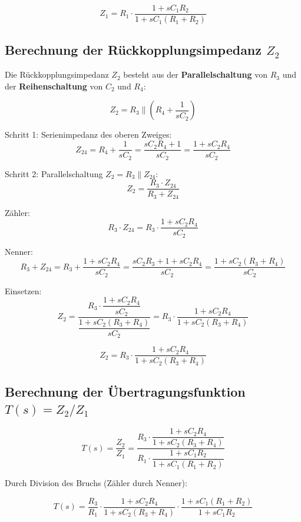 \documentclass[12pt,a4paper]{article}
\begin{document}
\begin{tcolorbox}[ergebnis]
\[
  \boxed{Z_1 = R_1 \cdot \frac{1 + sC_1 R_2}{1 + sC_1(R_1 + R_2)}}
\]
\end{tcolorbox}

\subsection{Berechnung der Rückkopplungsimpedanz $Z_2$}

Die Rückkopplungsimpedanz $Z_2$ besteht aus der \textbf{Parallelschaltung} von $R_3$
und der \textbf{Reihenschaltung} von $C_2$ und $R_4$:

\[
  Z_2 = R_3 \parallel \left(R_4 + \frac{1}{sC_2}\right)
\]

Schritt 1: Serienimpedanz des oberen Zweiges:
\[
  Z_{24} = R_4 + \frac{1}{sC_2} = \frac{sC_2 R_4 + 1}{sC_2}
          = \frac{1 + sC_2 R_4}{sC_2}
\]

Schritt 2: Parallelschaltung $Z_2 = R_3 \parallel Z_{24}$:
\[
  Z_2 = \frac{R_3 \cdot Z_{24}}{R_3 + Z_{24}}
\]

Zähler:
\[
  R_3 \cdot Z_{24} = R_3 \cdot \frac{1 + sC_2 R_4}{sC_2}
\]

Nenner:
\[
  R_3 + Z_{24} = R_3 + \frac{1 + sC_2 R_4}{sC_2}
               = \frac{sC_2 R_3 + 1 + sC_2 R_4}{sC_2}
               = \frac{1 + sC_2(R_3 + R_4)}{sC_2}
\]

Einsetzen:
\[
  Z_2 = \frac{R_3 \cdot \dfrac{1 + sC_2 R_4}{sC_2}}{\dfrac{1 + sC_2(R_3 + R_4)}{sC_2}}
       = R_3 \cdot \frac{1 + sC_2 R_4}{1 + sC_2(R_3 + R_4)}
\]

\begin{tcolorbox}[ergebnis]
\[
  \boxed{Z_2 = R_3 \cdot \frac{1 + sC_2 R_4}{1 + sC_2(R_3 + R_4)}}
\]
\end{tcolorbox}

\subsection{Berechnung der Übertragungsfunktion $T(s) = Z_2 / Z_1$}

\[
  T(s) = \frac{Z_2}{Z_1}
        = \frac{R_3 \cdot \dfrac{1 + sC_2 R_4}{1 + sC_2(R_3 + R_4)}}
              {R_1 \cdot \dfrac{1 + sC_1 R_2}{1 + sC_1(R_1 + R_2)}}
\]

Durch Division des Bruchs (Zähler durch Nenner):

\[
  T(s) = \frac{R_3}{R_1}
         \cdot \frac{1 + sC_2 R_4}{1 + sC_2(R_3 + R_4)}
         \cdot \frac{1 + sC_1(R_1 + R_2)}{1 + sC_1 R_2}
\]
\end{document}
